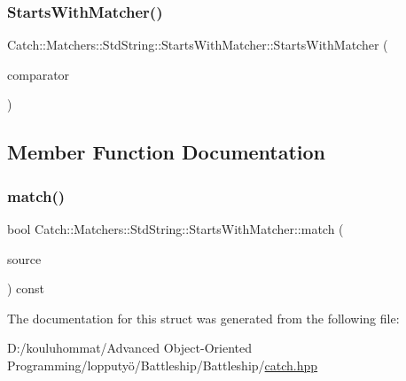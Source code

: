 \subsubsection{\texorpdfstring{Starts\+With\+Matcher()}{StartsWithMatcher()}}
{\footnotesize\ttfamily Catch\+::\+Matchers\+::\+Std\+String\+::\+Starts\+With\+Matcher\+::\+Starts\+With\+Matcher (\begin{DoxyParamCaption}\item[{\mbox{\hyperlink{struct_catch_1_1_matchers_1_1_std_string_1_1_cased_string}{Cased\+String}} const \&}]{comparator }\end{DoxyParamCaption})}



\subsection{Member Function Documentation}
\mbox{\label{struct_catch_1_1_matchers_1_1_std_string_1_1_starts_with_matcher_a7da4747aed0c48989d8be59a89e2b7fb}} 
\subsubsection{\texorpdfstring{match()}{match()}}
{\footnotesize\ttfamily bool Catch\+::\+Matchers\+::\+Std\+String\+::\+Starts\+With\+Matcher\+::match (\begin{DoxyParamCaption}\item[{std\+::string const \&}]{source }\end{DoxyParamCaption}) const\hspace{0.3cm}{\ttfamily [override]}}



The documentation for this struct was generated from the following file\+:\begin{DoxyCompactItemize}
\item 
D\+:/kouluhommat/\+Advanced Object-\/\+Oriented Programming/lopputyö/\+Battleship/\+Battleship/\mbox{\hyperlink{catch_8hpp}{catch.\+hpp}}\end{DoxyCompactItemize}
